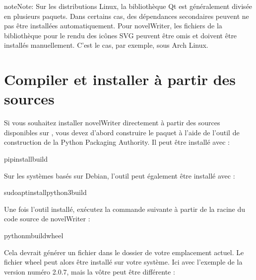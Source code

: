 \documentclass[a4paper,11pt,french]{sphinxmanual}
\begin{document}
\begin{sphinxadmonition}{note}{Note:}
\sphinxAtStartPar
Sur les distributions Linux, la bibliothèque Qt est généralement divisée en plusieurs paquets. Dans certains cas, des dépendances secondaires peuvent ne pas être installées automatiquement. Pour novelWriter, les fichiers de la bibliothèque pour le rendu des icônes SVG peuvent être omis et doivent être installés manuellement. C’est le cas, par exemple, sous Arch Linux.
\end{sphinxadmonition}


\section{Compiler et installer à partir des sources}
\label{\detokenize{tech_source:build-and-install-from-source}}\label{\detokenize{tech_source:a-source-install}}
\sphinxAtStartPar
Si vous souhaitez installer novelWriter directement à partir des sources disponibles sur , vous devez d’abord construire le paquet à l’aide de l’outil de construction de la Python Packaging Authority. Il peut être installé avec :

\begin{sphinxVerbatim}[commandchars=\\\{\}]
pipinstallbuild
\end{sphinxVerbatim}

\sphinxAtStartPar
Sur les systèmes basés sur Debian, l’outil peut également être installé avec :

\begin{sphinxVerbatim}[commandchars=\\\{\}]
sudoaptinstallpython3\PYGZhy{}build
\end{sphinxVerbatim}

\sphinxAtStartPar
Une fois l’outil installé, exécutez la commande suivante à partir de la racine du code source de novelWriter :

\begin{sphinxVerbatim}[commandchars=\\\{\}]
python\PYGZhy{}mbuild\PYGZhy{}\PYGZhy{}wheel
\end{sphinxVerbatim}

\sphinxAtStartPar
Cela devrait générer un fichier  dans le dossier  de votre emplacement actuel. Le fichier wheel peut alors être installé sur votre système. Ici avec l’exemple de la version numéro 2.0.7, mais la vôtre peut être différente :
\end{document}
